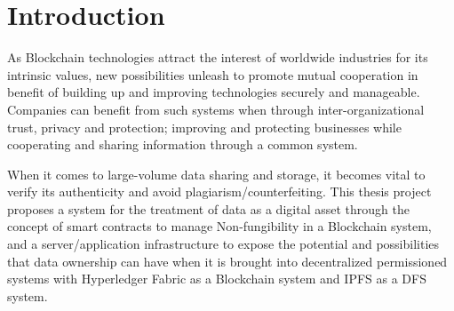 \chapter{Introduction}
\label{ch:intro}
As Blockchain technologies attract the interest of worldwide industries for its intrinsic values, new possibilities unleash to promote mutual cooperation in benefit of building up and improving technologies securely and manageable. Companies can benefit from such systems when through inter-organizational trust, privacy and protection; improving and protecting businesses while cooperating and sharing information through a common system. 

When it comes to large-volume data sharing and storage, it becomes vital to verify its authenticity and avoid plagiarism/counterfeiting. This thesis project proposes a system for the treatment of data as a digital asset through the concept of smart contracts to manage Non-fungibility in a Blockchain system, and a server/application infrastructure to expose the potential and possibilities that data ownership can have when it is brought into decentralized permissioned systems with Hyperledger Fabric as a Blockchain system and  \ac{IPFS} as a \ac{DFS} system.